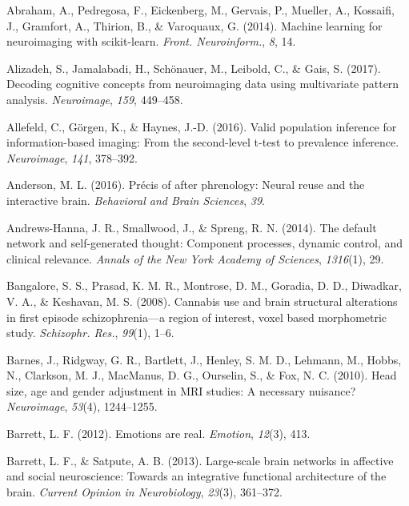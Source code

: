 \documentclass[12pt,american,a4paper,oneside,]{memoir} %
\begin{document}
\leavevmode\hypertarget{ref-Abraham2014-ef}{}%
Abraham, A., Pedregosa, F., Eickenberg, M., Gervais, P., Mueller, A., Kossaifi, J., Gramfort, A., Thirion, B., \& Varoquaux, G. (2014). Machine learning for neuroimaging with scikit-learn. \emph{Front. Neuroinform.}, \emph{8}, 14.

\leavevmode\hypertarget{ref-alizadeh2017decoding}{}%
Alizadeh, S., Jamalabadi, H., Schönauer, M., Leibold, C., \& Gais, S. (2017). Decoding cognitive concepts from neuroimaging data using multivariate pattern analysis. \emph{Neuroimage}, \emph{159}, 449--458.

\leavevmode\hypertarget{ref-Allefeld2016-xp}{}%
Allefeld, C., Görgen, K., \& Haynes, J.-D. (2016). Valid population inference for information-based imaging: From the second-level t-test to prevalence inference. \emph{Neuroimage}, \emph{141}, 378--392.

\leavevmode\hypertarget{ref-anderson2016precis}{}%
Anderson, M. L. (2016). Précis of after phrenology: Neural reuse and the interactive brain. \emph{Behavioral and Brain Sciences}, \emph{39}.

\leavevmode\hypertarget{ref-andrews2014default}{}%
Andrews-Hanna, J. R., Smallwood, J., \& Spreng, R. N. (2014). The default network and self-generated thought: Component processes, dynamic control, and clinical relevance. \emph{Annals of the New York Academy of Sciences}, \emph{1316}(1), 29.

\leavevmode\hypertarget{ref-Bangalore2008-kc}{}%
Bangalore, S. S., Prasad, K. M. R., Montrose, D. M., Goradia, D. D., Diwadkar, V. A., \& Keshavan, M. S. (2008). Cannabis use and brain structural alterations in first episode schizophrenia---a region of interest, voxel based morphometric study. \emph{Schizophr. Res.}, \emph{99}(1), 1--6.

\leavevmode\hypertarget{ref-Barnes2010-pu}{}%
Barnes, J., Ridgway, G. R., Bartlett, J., Henley, S. M. D., Lehmann, M., Hobbs, N., Clarkson, M. J., MacManus, D. G., Ourselin, S., \& Fox, N. C. (2010). Head size, age and gender adjustment in MRI studies: A necessary nuisance? \emph{Neuroimage}, \emph{53}(4), 1244--1255.

\leavevmode\hypertarget{ref-barrett2012emotions}{}%
Barrett, L. F. (2012). Emotions are real. \emph{Emotion}, \emph{12}(3), 413.

\leavevmode\hypertarget{ref-barrett2013large}{}%
Barrett, L. F., \& Satpute, A. B. (2013). Large-scale brain networks in affective and social neuroscience: Towards an integrative functional architecture of the brain. \emph{Current Opinion in Neurobiology}, \emph{23}(3), 361--372.
\end{document}
